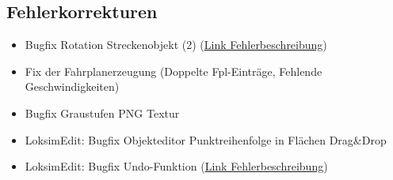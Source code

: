 \subsection{Fehlerkorrekturen}
\begin{itemize}
    \item Bugfix Rotation Streckenobjekt (2) (\href{https://www.loksimulatoren.de/forum/index.php?thread/8492-verschiebung-einzelner-objekte-innerhalb-gedrehter-streckenobjekte-werden-nicht/}{Link Fehlerbeschreibung})
    \item Fix der Fahrplanerzeugung (Doppelte Fpl-Einträge, Fehlende Geschwindigkeiten)
    \item Bugfix Graustufen PNG Textur
    \item LoksimEdit: Bugfix Objekteditor Punktreihenfolge in Flächen Drag{\&}Drop
    \item LoksimEdit: Bugfix Undo-Funktion (\href{https://www.loksimulatoren.de/forum/thread/8485-lastgeregelter-motorsound/}{Link Fehlerbeschreibung})
\end{itemize}
